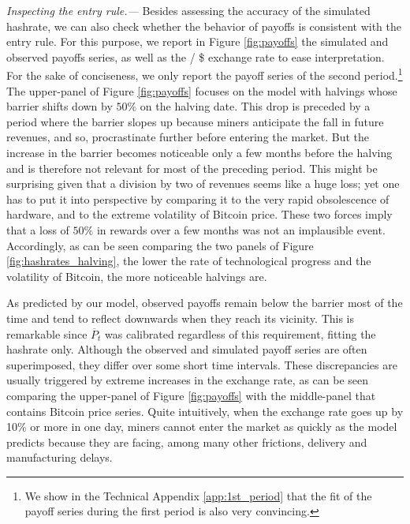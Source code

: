 \documentclass[12pt, a4paper]{article}
\def\bitcoinA{  \leavevmode
  \vtop{\offinterlineskip     \setbox0=\hbox{B}    \setbox2=\hbox to\wd0{\hfil\hskip-.00em
    \vrule height .3ex width .15ex\hskip .08em
    \vrule height .3ex width .15ex\hfil}
    \vbox{\copy2\box0}\box2}}
\begin{document}
\emph{Inspecting the entry rule.---} Besides assessing the
accuracy of the simulated hashrate, we can also check whether the behavior of payoffs
is consistent with the entry rule. For this purpose, we report in Figure \ref{fig:payoffs}
the simulated and
observed payoffs series, as well as the \bitcoinA / \$ exchange rate to ease interpretation.
For the sake of conciseness, we only report the payoff series of the second period.\footnote{
We show in the Technical Appendix \ref{app:1st_period} that the fit of the payoff series during the first period
is also very convincing.}
The upper-panel of Figure \ref{fig:payoffs} focuses on the model with halvings
whose barrier shifts down by $50\%$ on the halving date. This drop is preceded by a period where the barrier slopes up because
miners anticipate the fall in future revenues, and so, procrastinate further
before entering the market. But
the increase in the barrier becomes noticeable only a
few months before the halving and is therefore not relevant for most of the preceding
period. This might be surprising given that a division by two of revenues
seems like a huge loss; yet one has to put it into perspective by comparing
it to the very rapid obsolescence of hardware, and to the extreme volatility of Bitcoin price.
These two forces imply that a loss of $50\%$ in rewards over a few months was not an
implausible event. Accordingly, as can be seen comparing
the two panels of Figure \ref{fig:hashrates_halving}, the lower the rate of technological progress and the volatility of Bitcoin,
the more noticeable halvings are.

As predicted by our model, observed payoffs remain below the barrier most
of the time and tend to reflect downwards when they reach its vicinity. This
is remarkable since $\overline{P}_t$ was calibrated regardless of
this requirement, fitting the hashrate only. Although the observed and simulated
payoff series are often superimposed,
they differ over some short time intervals.
These discrepancies are usually triggered by extreme increases in
the exchange rate, as can be seen comparing the upper-panel of Figure \ref{fig:payoffs}
with the middle-panel that contains Bitcoin price series. Quite
intuitively, when the exchange rate goes up by 10\% or more in one day,
miners cannot enter the market as
quickly as the model predicts because they are facing, among many other
frictions, delivery and manufacturing delays.
\end{document}
